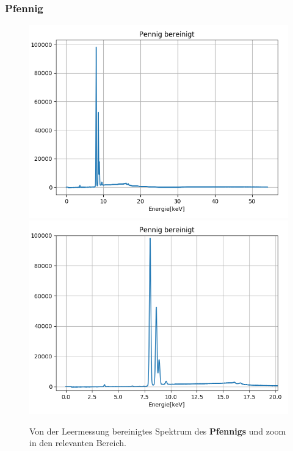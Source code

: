 \documentclass[12pt,a4paper]{article}
\begin{document}
\subsubsection{Pfennig}
\begin{figure}[H]
\centering
\includegraphics[scale=0.49]{Bilder/roentgen_spektren/pfennig_0.png}
\includegraphics[scale=0.49]{Bilder/roentgen_spektren/pfennig_1.png}
\caption{Von der Leermessung bereinigtes Spektrum des \textbf{Pfennigs} und zoom in den relevanten Bereich.}
\label{fig:prop_dinar}
\end{figure}
\end{document}
